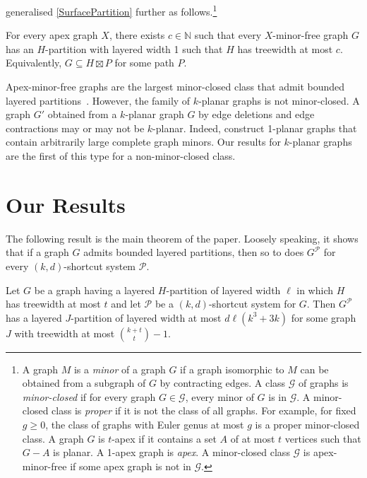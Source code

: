 \documentclass{patmorin}
\newcommand{\PP}{\mathcal{P}}
\renewcommand{\geq}{\geqslant}
\begin{document}
\citet{dujmovic.joret.ea:planar} generalised \cref{SurfacePartition} further as follows.\footnote{A graph $M$ is a \textit{minor} of a graph $G$ if a graph isomorphic to $M$ can be obtained from a subgraph of $G$ by contracting edges. A class $\mathcal{G}$ of graphs is \emph{minor-closed} if for every graph $G\in\mathcal{G}$, every minor of $G$ is in $\mathcal{G}$. A minor-closed class is \emph{proper} if it is not the class of all graphs. For example, for fixed $g\geq 0$, the class of graphs with Euler genus at most $g$ is a proper minor-closed class. A graph $G$ is $t$-apex if it contains a set $A$ of at most $t$ vertices such that $G-A$ is planar. A 1-apex graph is \emph{apex}.  A minor-closed class $\mathcal{G}$ is apex-minor-free if some apex graph is not in $\mathcal{G}$.}

\begin{thm} 
\label{ApexMinorFree}
For every apex graph $X$, there exists $c\in\mathbb{N}$ such that every $X$-minor-free graph $G$ has
an $H$-partition with layered width 1 such that $H$ has treewidth at most $c$. Equivalently, $G\subseteq H\boxtimes P$ for some path $P$. 
\end{thm}

Apex-minor-free graphs are the largest minor-closed class that admit bounded layered partitions~\citep{dujmovic.joret.ea:planar}. However, the family of $k$-planar graphs is not minor-closed.  A graph $G'$ obtained from a $k$-planar graph $G$ by edge deletions and edge contractions may or may not be $k$-planar. Indeed, \citet{dujmovic.eppstein.ea:structure} construct 1-planar graphs that contain arbitrarily large complete graph minors. Our results for $k$-planar graphs are the first of this type for a non-minor-closed class. 

\section{Our Results}

The following result is the main theorem of the paper. Loosely speaking, it shows that if a graph $G$ admits bounded layered partitions, then so to does $G^\PP$ for every $(k,d)$-shortcut system $\PP$. 

\begin{thm}\label{modern-major-general}
  Let $G$ be a graph having a layered $H$-partition of layered width $\ell$ in which $H$ has treewidth at most $t$ and let $\PP$ be a $(k,d)$-shortcut system for $G$.  Then $G^\PP$ has a layered $J$-partition of layered width at most $d\ell(k^3+3k)$ for some graph $J$ with treewidth at most $\binom{k+t}{t}-1$.
\end{thm}
\end{document}
